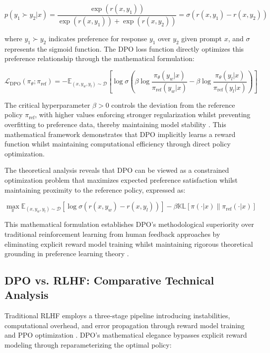 $$p(y_1 \succ y_2 | x) = \frac{\exp(r(x, y_1))}{\exp(r(x, y_1)) + \exp(r(x, y_2))} = \sigma(r(x, y_1) - r(x, y_2))$$

where $y_1 \succ y_2$ indicates preference for response $y_1$ over $y_2$ given prompt $x$, and $\sigma$ represents the sigmoid function. The DPO loss function directly optimizes this preference relationship through the mathematical formulation:

$$\mathcal{L}_{\text{DPO}}(\pi_\theta; \pi_{\text{ref}}) = -\mathbb{E}_{(x,y_w,y_l) \sim \mathcal{D}}\left[\log \sigma\left(\beta \log \frac{\pi_\theta(y_w|x)}{\pi_{\text{ref}}(y_w|x)} - \beta \log \frac{\pi_\theta(y_l|x)}{\pi_{\text{ref}}(y_l|x)}\right)\right]$$

The critical hyperparameter $\beta > 0$ controls the deviation from the reference policy $\pi_{\text{ref}}$, with higher values enforcing stronger regularization whilst preventing overfitting to preference data, thereby maintaining model stability \cite{azar2023general_theory_human_preferences}. This mathematical framework demonstrates that DPO implicitly learns a reward function whilst maintaining computational efficiency through direct policy optimization.

The theoretical analysis reveals that DPO can be viewed as a constrained optimization problem that maximizes expected preference satisfaction whilst maintaining proximity to the reference policy, expressed as:

$$\max_{\pi} \mathbb{E}_{(x,y_w,y_l) \sim \mathcal{D}}[\log \sigma(r(x, y_w) - r(x, y_l))] - \beta \mathbb{KL}[\pi(\cdot|x) \| \pi_{\text{ref}}(\cdot|x)]$$

This mathematical formulation establishes DPO's methodological superiority over traditional reinforcement learning from human feedback approaches by eliminating explicit reward model training whilst maintaining rigorous theoretical grounding in preference learning theory \cite{liu2025dpo_survey}.

\subsection{DPO vs. RLHF: Comparative Technical Analysis}

Traditional RLHF employs a three-stage pipeline introducing instabilities, computational overhead, and error propagation through reward model training and PPO optimization \cite{kaufmann2023rlhf_survey, lambert2023alignment_ceiling}. DPO's mathematical elegance bypasses explicit reward modeling through reparameterizing the optimal policy:

